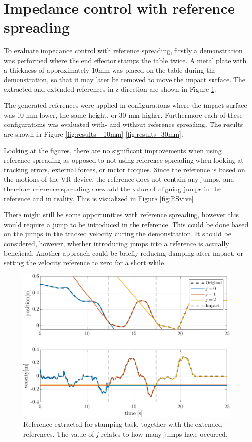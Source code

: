 \documentclass[11pt]{report}
\numberwithin{equation}{section}        %
\numberwithin{figure}{section}          %
\numberwithin{table}{section}           %
\begin{document}
  \newpage
  \section{Impedance control with reference spreading}
  To evaluate impedance control with reference spreading, firstly a demonstration was performed where the end effector stamps the table twice. A metal plate with a thickness of approximately 10mm was placed on the table during the demonstration, so that it may later be removed to move the impact surface. The extracted and extended references in z-direction are shown in Figure \ref{fig:spreading}.

  The generated references were applied in configurations where the impact surface was 10 mm lower, the same height, or 30 mm higher. Furthermore each of these configurations was evaluated with- and without reference spreading. The results are shown in Figure \ref{fig:results_-10mm}-\ref{fig:results_30mm}. 

  Looking at the figures, there are no significant improvements when using reference spreading as opposed to not using reference spreading when looking at tracking errors, external forces, or motor torques. Since the reference is based on the motions of the VR device, the reference does not contain any jumps, and therefore reference spreading does add the value of aligning jumps in the reference and in reality. This is visualized in Figure \ref{fig:RSvive}.

  There might still be some opportunities with reference spreading, however this would require a jump to be introduced in the reference. This could be done based on the jumps in the tracked velocity during the demonstration. It should be considered, however, whether introducing jumps into a reference is actually beneficial. Another approach could be briefly reducing damping after impact, or setting the velocity reference to zero for a short while.

  \begin{figure}[]
  \centering
  \begin{adjustwidth}{0pt}{5pt}
  \includegraphics[right]{Graphics/spreading.pdf}
  \end{adjustwidth}
  \caption{Reference extracted for stamping task, together with the extended references. The value of $j$ relates to how many jumps have occurred.}
  \label{fig:spreading}
  \end{figure}
\end{document}
